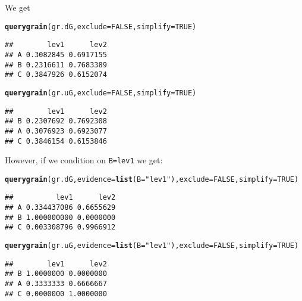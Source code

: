 \documentclass[10pt]{article}\usepackage[]{graphicx}\usepackage[]{xcolor}
\makeatletter
\newcommand{\hlnum}[1]{\textcolor[rgb]{0.686,0.059,0.569}{#1}}%
\newcommand{\hlstr}[1]{\textcolor[rgb]{0.192,0.494,0.8}{#1}}%
\newcommand{\hlstd}[1]{\textcolor[rgb]{0.345,0.345,0.345}{#1}}%
\newcommand{\hlkwc}[1]{\textcolor[rgb]{0.333,0.667,0.333}{#1}}%
\newcommand{\hlkwd}[1]{\textcolor[rgb]{0.737,0.353,0.396}{\textbf{#1}}}%
\newenvironment{kframe}{%
 \def\at@end@of@kframe{}%
 \ifinner\ifhmode%
  \def\at@end@of@kframe{\end{minipage}}%
  \begin{minipage}{\columnwidth}%
 \fi\fi%
 \def\FrameCommand##1{\hskip\@totalleftmargin \hskip-\fboxsep
 \colorbox{shadecolor}{##1}\hskip-\fboxsep
     \hskip-\linewidth \hskip-\@totalleftmargin \hskip\columnwidth}%
 \MakeFramed {\advance\hsize-\width
   \@totalleftmargin\z@ \linewidth\hsize
   \@setminipage}}%
 {\par\unskip\endMakeFramed%
 \at@end@of@kframe}
\newenvironment{knitrout}{}{} %
\def\code#1{{\texttt{#1}}}
\makeatother
\begin{document}
We get
\begin{knitrout}
\color{fgcolor}\begin{kframe}
\begin{alltt}
\hlkwd{querygrain}\hlstd{(gr.dG,} \hlkwc{exclude}\hlstd{=}\hlnum{FALSE}\hlstd{,} \hlkwc{simplify}\hlstd{=}\hlnum{TRUE}\hlstd{)}
\end{alltt}
\begin{verbatim}
##        lev1      lev2
## A 0.3082845 0.6917155
## B 0.2316611 0.7683389
## C 0.3847926 0.6152074
\end{verbatim}
\begin{alltt}
\hlkwd{querygrain}\hlstd{(gr.uG,} \hlkwc{exclude}\hlstd{=}\hlnum{FALSE}\hlstd{,} \hlkwc{simplify}\hlstd{=}\hlnum{TRUE}\hlstd{)}
\end{alltt}
\begin{verbatim}
##        lev1      lev2
## B 0.2307692 0.7692308
## A 0.3076923 0.6923077
## C 0.3846154 0.6153846
\end{verbatim}
\end{kframe}
\end{knitrout}

However, if we condition on \code{B=lev1} we get:
\begin{knitrout}
\color{fgcolor}\begin{kframe}
\begin{alltt}
\hlkwd{querygrain}\hlstd{(gr.dG,} \hlkwc{evidence}\hlstd{=}\hlkwd{list}\hlstd{(}\hlkwc{B}\hlstd{=}\hlstr{"lev1"}\hlstd{),} \hlkwc{exclude}\hlstd{=}\hlnum{FALSE}\hlstd{,} \hlkwc{simplify}\hlstd{=}\hlnum{TRUE}\hlstd{)}
\end{alltt}
\begin{verbatim}
##          lev1      lev2
## A 0.334437086 0.6655629
## B 1.000000000 0.0000000
## C 0.003308796 0.9966912
\end{verbatim}
\begin{alltt}
\hlkwd{querygrain}\hlstd{(gr.uG,} \hlkwc{evidence}\hlstd{=}\hlkwd{list}\hlstd{(}\hlkwc{B}\hlstd{=}\hlstr{"lev1"}\hlstd{),} \hlkwc{exclude}\hlstd{=}\hlnum{FALSE}\hlstd{,} \hlkwc{simplify}\hlstd{=}\hlnum{TRUE}\hlstd{)}
\end{alltt}
\begin{verbatim}
##        lev1      lev2
## B 1.0000000 0.0000000
## A 0.3333333 0.6666667
## C 0.0000000 1.0000000
\end{verbatim}
\end{kframe}
\end{knitrout}
\end{document}
